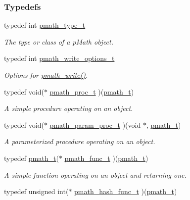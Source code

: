 \subsubsection*{Typedefs}
\begin{CompactItemize}
\item 
typedef int \hyperlink{group__objects_ge2646df76dcb0113715322b13a1f36f0}{pmath\_\-type\_\-t}
\begin{CompactList}\small\item\em The type or class of a pMath object. \item\end{CompactList}\item 
typedef int \hyperlink{group__objects_gd83ea6a616c49cbe35b5d3dafb877f7e}{pmath\_\-write\_\-options\_\-t}
\begin{CompactList}\small\item\em Options for \hyperlink{group__objects_g9f909b9eb04317260ee8630d10e5a7c6}{pmath\_\-write()}. \item\end{CompactList}\item 
typedef void($\ast$ \hyperlink{group__objects_g6c56c2d026f4cc8603a217291a8a35fb}{pmath\_\-proc\_\-t} )(\hyperlink{classpmath__t}{pmath\_\-t})
\begin{CompactList}\small\item\em A simple procedure operating on an object. \item\end{CompactList}\item 
typedef void($\ast$ \hyperlink{group__objects_g3ae604b25e05979c1e7ff48524636b3e}{pmath\_\-param\_\-proc\_\-t} )(void $\ast$, \hyperlink{classpmath__t}{pmath\_\-t})
\begin{CompactList}\small\item\em A parameterized procedure operating on an object. \item\end{CompactList}\item 
typedef \hyperlink{classpmath__t}{pmath\_\-t}($\ast$ \hyperlink{group__objects_g9dd57b578f42f0556a7d1c1709f97847}{pmath\_\-func\_\-t} )(\hyperlink{classpmath__t}{pmath\_\-t})
\begin{CompactList}\small\item\em A simple function operating on an object and returning one. \item\end{CompactList}\item 
typedef unsigned int($\ast$ \hyperlink{group__objects_gf7afa773c11a686f6abd7586e0a6a33d}{pmath\_\-hash\_\-func\_\-t} )(\hyperlink{classpmath__t}{pmath\_\-t})

\end{CompactItemize}
